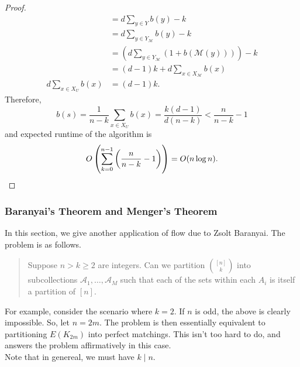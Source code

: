 \begin{proof}
\begin{align*}
						&= d \sum_{y \in Y} b(y) - k \\
						&= d \sum_{y \in Y_\mathcal{M}} b(y) - k \\
						&= \left(d \sum_{y \in Y_\mathcal{M}} (1 + b(\mathcal{M}(y)))\right) - k \\
						&= (d-1)k + d \sum_{x \in X_\mathcal{M}} b(x) \\
					d \sum_{x \in X_U} b(x) &= (d-1)k.
				\end{align*}
				Therefore,
				\[ b(s) = \frac{1}{n-k} \sum_{x \in X_U} b(x) = \frac{k(d-1)}{d(n-k)} < \frac{n}{n-k} - 1 \]
				and expected runtime of the algorithm is
				\[ O\left(\sum_{k=0}^{n-1} \left( \frac{n}{n-k} - 1 \right)\right) = O(n\log n). \qedhere \]
			\end{proof}

		\subsubsection{Baranyai's Theorem and Menger's Theorem}

			In this section, we give another application of flow due to Zsolt Baranyai. The problem is as follows.

			\begin{quote}
				Suppose $n > k \ge 2$ are integers. Can we partition $\binom{[n]}{k}$ into subcollections $\mathcal{A}_1,\ldots,\mathcal{A}_M$ such that each of the sets within each $A_i$ is itself a partition of $[n]$. 
			\end{quote}

			For example, consider the scenario where $k=2$. If $n$ is odd, the above is clearly impossible. So, let $n = 2m$. The problem is then essentially equivalent to partitioning $E(K_{2m})$ into perfect matchings. This isn't too hard to do, and answers the problem affirmatively in this case.\\
			Note that in genereal, we must have $k\mid n$.

